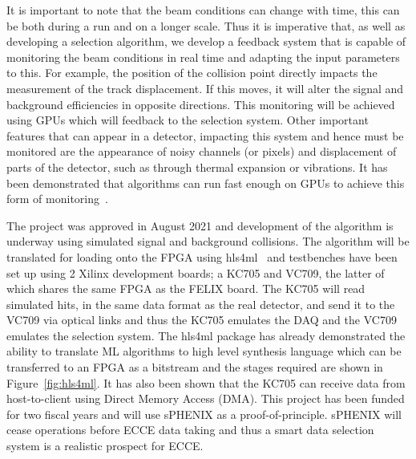 It is important to note that the beam conditions can change with time, this can be both during a run and on a longer scale. Thus it is imperative that, as well as developing a selection algorithm, we develop a feedback system that is capable of monitoring the beam conditions in real time and adapting the input parameters to this. For example, the position of the collision point directly impacts the measurement of the track displacement. If this moves, it will alter the signal and background efficiencies in opposite directions. This monitoring will be achieved using GPUs which will feedback to the selection system. Other important features that can appear in a detector, impacting this system and hence must be monitored are the appearance of noisy channels (or pixels) and displacement of parts of the detector, such as through thermal expansion or vibrations. It has been demonstrated that algorithms can run fast enough on GPUs to achieve this form of monitoring~\cite{gpu2021}.

The project was approved in August 2021 and development of the algorithm is underway using simulated signal and background collisions. The algorithm will be translated for loading onto the FPGA using hls4ml~\cite{fahim2021hls4ml} and testbenches have been set up using 2 Xilinx development boards; a KC705 and VC709, the latter of which shares the same FPGA as the FELIX board. The KC705 will read simulated hits, in the same data format as the real detector, and send it to the VC709 via optical links and thus the KC705 emulates the DAQ and the VC709 emulates the selection system. The hls4ml package has already demonstrated the ability to translate ML algorithms to high level synthesis language which can be transferred to an FPGA as a bitstream and the stages required are shown in Figure~\ref{fig:hls4ml}. It has also been shown that the KC705 can receive data from host-to-client using Direct Memory Access (DMA). This project has been funded for two fiscal years and will use sPHENIX as a proof-of-principle. sPHENIX will cease operations before ECCE data taking and thus a smart data selection system is a realistic prospect for ECCE.

